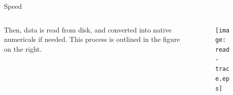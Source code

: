 \documentclass[final]{beamer}
\begin{document}
\begin{frame}{}
\begin{center}
\begin{minipage}{0.9\paperwidth}
\begin{block}{\large Speed}
\begin{columns}[t]
\begin{column}{.6\textwidth}
        Then, data is read from disk, and converted into native numericals if
        needed. This process is outlined in the figure on the right.
    \end{column}

    \begin{column}{.25\textwidth}
        \begin{figure}
            \texttt{[image: read-trace.eps]}
            \label{fig:read-trace-graph}
        \end{figure}
    \end{column}
    \end{columns}
\end{block}

\end{minipage}
\end{center}

\end{frame}
\end{document}
